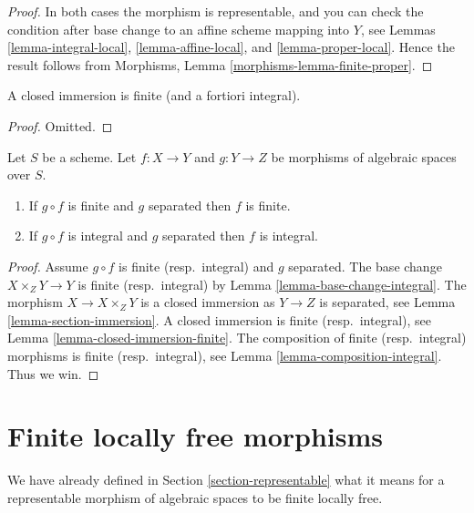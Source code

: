 \begin{proof}
In both cases the morphism is representable, and you can check the condition
after base change to an affine scheme mapping into $Y$, see
Lemmas \ref{lemma-integral-local}, \ref{lemma-affine-local}, and
\ref{lemma-proper-local}. Hence the result follows from
Morphisms, Lemma \ref{morphisms-lemma-finite-proper}.
\end{proof}

\begin{lemma}
\label{lemma-closed-immersion-finite}
A closed immersion is finite (and a fortiori integral).
\end{lemma}

\begin{proof}
Omitted.
\end{proof}

\begin{lemma}
\label{lemma-finite-permanence}
Let $S$ be a scheme.
Let $f : X \to Y$ and $g : Y \to Z$ be morphisms of algebraic spaces over $S$.
\begin{enumerate}
\item If $g \circ f$ is finite and $g$ separated then $f$ is finite.
\item If $g \circ f$ is integral and $g$ separated then $f$ is integral.
\end{enumerate}
\end{lemma}

\begin{proof}
Assume $g \circ f$ is finite (resp.\ integral) and $g$ separated.
The base change $X \times_Z Y \to Y$ is finite (resp.\ integral) by
Lemma \ref{lemma-base-change-integral}.
The morphism $X \to X \times_Z Y$ is
a closed immersion as $Y \to Z$ is separated, see
Lemma \ref{lemma-section-immersion}.
A closed immersion is finite (resp.\ integral),
see Lemma \ref{lemma-closed-immersion-finite}.
The composition of finite (resp.\ integral) morphisms is finite
(resp.\ integral),
see Lemma \ref{lemma-composition-integral}. Thus we win.
\end{proof}





\section{Finite locally free morphisms}
\label{section-finite-locally-free}

\noindent
We have already defined in Section \ref{section-representable}
what it means for a representable morphism of algebraic spaces
to be finite locally free.

